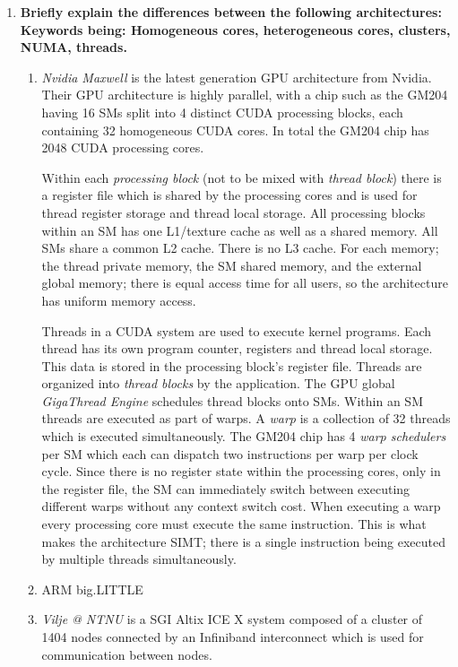 \begin{enumerate}

\item \textbf{Briefly explain the differences between the following architectures:\\
Keywords being: Homogeneous cores, heterogeneous cores, clusters, NUMA, threads.}

\begin{enumerate}
\item \textit{Nvidia Maxwell} is the latest generation \ac{GPU} architecture from Nvidia. Their \ac{GPU} architecture is highly parallel, with a chip such as the GM204 having 16 \acp{SM} split into 4 distinct \ac{CUDA} processing blocks, each containing 32 homogeneous \ac{CUDA} cores. In total the GM204 chip has 2048 \ac{CUDA} processing cores.

Within each \textit{processing block} (not to be mixed with \textit{thread block}) there is a register file which is shared by the processing cores and is used for thread register storage and thread local storage. All processing blocks within an \ac{SM} has one L1/texture cache as well as a shared memory. All \acp{SM} share a common L2 cache. There is no L3 cache. For each memory; the thread private memory, the \ac{SM} shared memory, and the external global memory; there is equal access time for all users, so the architecture has uniform memory access.

Threads in a \ac{CUDA} system are used to execute kernel programs. Each thread has its own program counter, registers and thread local storage. This data is stored in the processing block's register file. Threads are organized into \textit{thread blocks} by the application. The \ac{GPU} global \textit{GigaThread Engine} schedules thread blocks onto \acp{SM}. Within an \ac{SM} threads are executed as part of warps. A \textit{warp} is a collection of 32 threads which is executed simultaneously. The GM204 chip has 4 \textit{warp schedulers} per \ac{SM} which each can dispatch two instructions per warp per clock cycle. Since there is no register state within the processing cores, only in the register file, the \ac{SM} can immediately switch between executing different warps without any context switch cost. When executing a warp every processing core must execute the same instruction. This is what makes the architecture \ac{SIMT}; there is a single instruction being executed by multiple threads simultaneously. 

\item ARM big.LITTLE
\item \textit{Vilje @ NTNU} is a \ac{SGI} Altix ICE X system composed of a cluster of 1404 nodes connected by an Infiniband interconnect which is used for communication between nodes.


\end{enumerate}
\end{enumerate}
